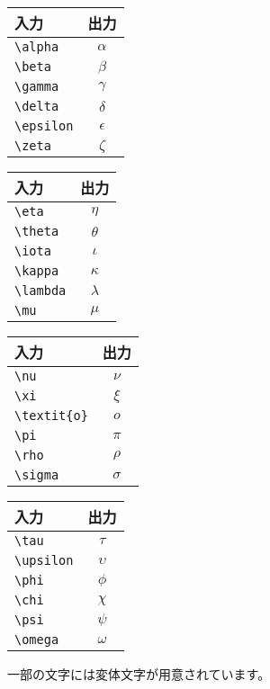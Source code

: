 \begin{tabular}{lc}
入力 & 出力 \\ \hline
\verb|\alpha| & $\alpha$ \\
\verb|\beta| & $\beta$ \\
\verb|\gamma| & $\gamma$ \\
\verb|\delta| & $\delta$ \\
\verb|\epsilon| & $\epsilon$ \\
\verb|\zeta| & $\zeta$ \\
\end{tabular}
\begin{tabular}{lc}
入力 & 出力 \\ \hline
\verb|\eta| & $\eta$ \\
\verb|\theta| & $\theta$ \\
\verb|\iota| & $\iota$ \\
\verb|\kappa| & $\kappa$ \\
\verb|\lambda| & $\lambda$ \\
\verb|\mu| & $\mu$ \\
\end{tabular}
\begin{tabular}{lc}
入力 & 出力 \\ \hline
\verb|\nu| & $\nu$ \\
\verb|\xi| & $\xi$ \\
\verb|\textit{o}| & $\textit{o}$ \\
\verb|\pi| & $\pi$ \\
\verb|\rho| & $\rho$ \\
\verb|\sigma| & $\sigma$ \\
\end{tabular}
\begin{tabular}{lc}
入力 & 出力 \\ \hline
\verb|\tau| & $\tau$ \\
\verb|\upsilon| & $\upsilon$ \\
\verb|\phi| & $\phi$ \\
\verb|\chi| & $\chi$ \\
\verb|\psi| & $\psi$ \\
\verb|\omega| & $\omega$ \\
\end{tabular}

一部の文字には変体文字が用意されています。

